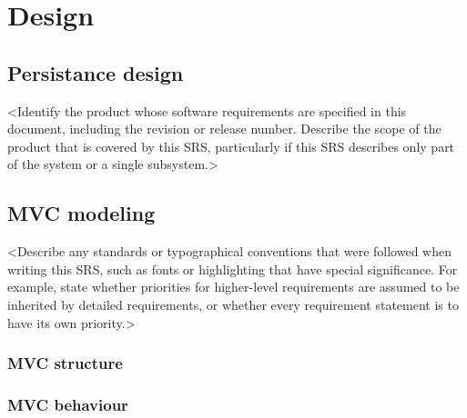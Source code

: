 \chapter{Design} \label{cap:cap3}

\section{Persistance design}
<Identify the product whose software requirements are specified in this document, including the revision or release number. Describe the scope of the product that is covered by this SRS, particularly if this SRS describes only part of the system or a single subsystem.>

\section{MVC modeling}
<Describe any standards or typographical conventions that were followed when writing this SRS, such as fonts or highlighting that have special significance. For example, state whether priorities  for higher-level requirements are assumed to be inherited by detailed requirements, or whether every requirement statement is to have its own priority.>

\subsection{MVC structure}
\subsection{MVC behaviour}

